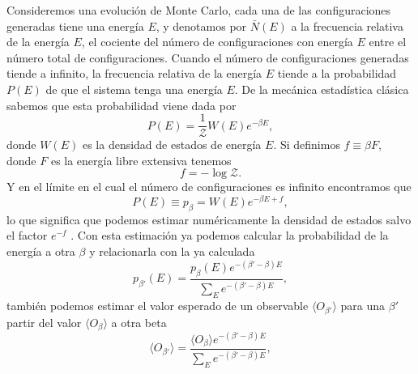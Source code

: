 Consideremos una evolución de Monte Carlo, cada una de las configuraciones
generadas tiene una energía $E$, y denotamos por $\bar{N}(E)$ a la frecuencia
relativa de la energía $E$, el cociente del número de configuraciones con
energía $E$ entre el número total de configuraciones. Cuando el número de
configuraciones generadas tiende a infinito, la frecuencia relativa de la
energía $E$ tiende a la probabilidad $P(E)$ de que el sistema tenga una
energía $E$. De la mecánica estadística clásica sabemos que esta probabilidad
viene dada por
\begin{equation}
P(E)=\frac{1}{\mathcal{Z}}W(E)e^{-\beta E},  
\end{equation}
donde $W(E)$ es la densidad de estados de energía $E$. Si definimos $f\equiv
\beta F$, donde $F$ es la energía libre extensiva tenemos
\begin{equation}
f=-\log \mathcal{Z}.
\end{equation}
Y en el límite en el cual el número de configuraciones es infinito encontramos
que
\begin{equation}
P(E)\equiv p_{\beta}=W(E)e^{-\beta E+f} ,
\end{equation}
lo que significa que podemos estimar numéricamente la densidad de estados
salvo el factor $e^{-f}$ \cite{Juan:tesis}. Con esta estimación ya podemos calcular la
probabilidad de la energía a otra $\beta$ y relacionarla con la ya calculada
\begin{equation}
p_{\beta'}(E)=\frac{p_{\beta}(E)e^{-(\beta'-\beta)E}}{\sum_E e^{-(\beta'-\beta)E}},
\end{equation}
también podemos estimar el valor esperado de un observable $\langle
O_{\beta'}\rangle$  para una $\beta'$ partir del valor $\langle
O_{\beta}\rangle$ a otra beta
\begin{equation}
\langle O_{\beta'}\rangle=\frac{\langle
O_{\beta}\rangle e^{-(\beta'-\beta)E}}{\sum_E e^{-(\beta'-\beta)E}},
\end{equation}

